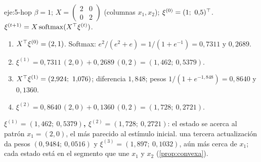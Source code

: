 \begin{solucion}{eje:5-hop}
\datos $\beta=1$; $X=\begin{pmatrix}2&0\\0&2\end{pmatrix}$ (columnas $x_1,x_2$); $\xi^{(0)}=(1;\allowbreak\ 0{,}5)^{\top}$.
\planteamiento $\xi^{(t+1)}=X\operatorname{softmax}(X^{\top}\xi^{(t)})$.
\pasos
\begin{enumerate}[label=\arabic*.]
  \item $X^{\top}\xi^{(0)}=(2,1)$. Softmax: $e^{2}/(e^{2}+e)=1/(1+e^{-1})=0{,}7311$ y $0{,}2689$.
  \item $\xi^{(1)}=0{,}7311\,(2,0)+0{,}2689\,(0,2)=(1{,}462;\allowbreak\ 0{,}5379)$.
  \item $X\T\xi^{(1)}=(2{,}924;\allowbreak\ 1{,}076)$; diferencia $1{,}848$; pesos $1/(1+e^{-1{,}848})=0{,}8640$ y $0{,}1360$.
  \item $\xi^{(2)}=0{,}8640\,(2,0)+0{,}1360\,(0,2)=(1{,}728;\allowbreak\ 0{,}2721)$.
\end{enumerate}
\resultado \textbf{$\xi^{(1)}=(1{,}462;\allowbreak\ 0{,}5379)$, $\xi^{(2)}=(1{,}728;\allowbreak\ 0{,}2721)$}: el estado se acerca al patrón $x_1=(2,0)$, el más parecido al estímulo inicial.
\comprobacion una tercera actualización da pesos $(0{,}9484;\allowbreak\ 0{,}0516)$ y $\xi^{(3)}=(1{,}897;\allowbreak\ 0{,}1032)$, aún más cerca de $x_1$; cada estado está en el segmento que une $x_1$ y $x_2$ (\cref{prop:convexa}).
\end{solucion}

